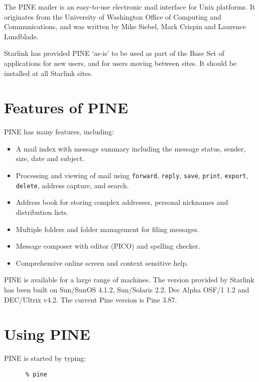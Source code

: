 The PINE mailer is an easy-to-use electronic mail interface for Unix
platforms. It originates from the University of Washington Office of
Computing and Communications, and was written by Mike Siebel, Mark
Crispin and Laurence Lundblade.

Starlink has provided PINE `as-is' to be used as part of the 
Base Set of applications for new users, and for users moving between
sites. It should be installed at all Starlink sites.

\section{Features of PINE}

PINE has many features, including:

\begin{itemize}

\item A mail index with message summary including the message status,
sender, size, date and subject.

\item Processing and viewing of mail using {\tt forward}, {\tt reply},
{\tt save}, {\tt print}, {\tt export}, {\tt delete}, address capture,
and search.

\item Address book for storing complex addresses, personal nicknames
and distribution lists.

\item Multiple folders and folder management for filing messages.

\item Message composer with editor (PICO) and spelling checker.

\item Comprehensive online screen and context sensitive help.

\end{itemize}

PINE is available for a large range of machines. The version provided by
Starlink has been built on Sun/SunOS 4.1.2, Sun/Solaris 2.2, Dec Alpha OSF/1
1.2 and DEC/Ultrix v4.2. The current Pine version is Pine 3.87.

\section{Using PINE}

PINE is started by typing:

\begin{verbatim}
      % pine
\end{verbatim}

